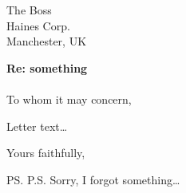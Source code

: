 \documentclass{UoM_letter}
\begin{document}
\begin{letter}{The Boss \\ Haines Corp. \\ Manchester, UK}

\opening{\textbf{Re: something}\\\\To whom it may concern,}

Letter text\ldots



\closing{Yours faithfully,}

\ps{P.S. Sorry, I forgot something\ldots}

\end{letter}
\end{document}
